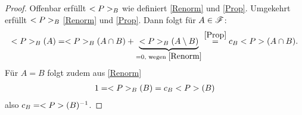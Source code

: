\begin{proof} %
	Offenbar erfüllt $<P>_{B}$ wie definiert \eqref{Renorm} und \eqref{Prop}. Umgekehrt erfüllt $<P>_{B}$ \eqref{Renorm} und \eqref{Prop}. Dann folgt für $A \in \mathscr{F}$:
	\begin{align}
		<P>_{B}(A) = <P>_{B}(A\cap B) + \underbrace{<P>_{B}(A\setminus B)}_{= 0, \text{ wegen } \eqref{Renorm}} \overset{\eqref{Prop}}{=} c_B <P>(A \cap B).\notag
	\end{align}
	Für $A=B$ folgt zudem aus \eqref{Renorm}
	\begin{align}
		1 = <P>_{B}(B) = c_B <P>(B)\notag
	\end{align}
	also $c_B = <P>(B)^{-1}$.
\end{proof}